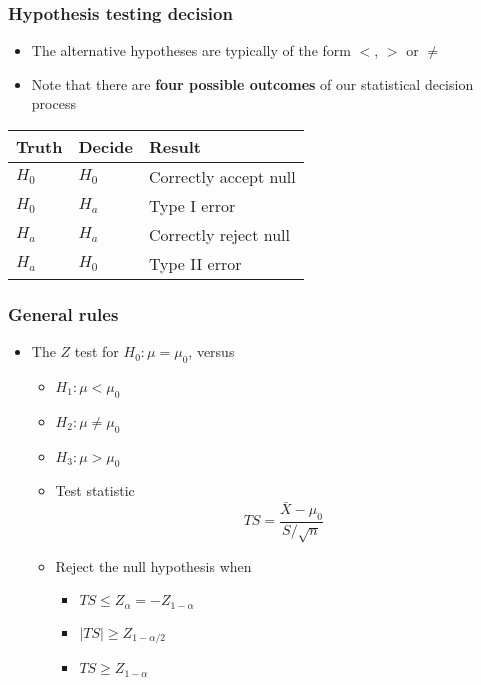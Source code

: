 \documentclass[10pt,article]{article}
\begin{document}
\subsubsection{Hypothesis testing decision}
\label{sec:org731ce84}
\begin{itemize}
\item The alternative hypotheses are typically of the form \(<\), \(>\) or \(\neq\)
\item Note that there are \textbf{four possible outcomes} of our {\color{green}statistical decision} process
\end{itemize}
\begin{center}
\begin{tabular}{lll}
Truth & Decide & Result\\
\hline
\(H_0\) & \(H_0\) & Correctly accept null\\
\(H_0\) & \(H_a\) & Type I error\\
\(H_a\) & \(H_a\) & Correctly reject null\\
\(H_a\) & \(H_0\) & Type II error\\
\end{tabular}
\end{center}
\subsubsection{General rules}
\label{sec:org1cd9738}
\begin{itemize}
\item The \(Z\) test for \(H_0:\mu = \mu_0\), versus
\begin{itemize}
\item \(H_1: \mu < \mu_0\)
\item \(H_2: \mu \neq \mu_0\)
\item \(H_3: \mu > \mu_0\)
\end{itemize}
\begin{itemize}
\item Test statistic $$TS = \frac{\bar{X} - \mu_0}{S / \sqrt{n}}$$
\item Reject the null hypothesis when
\begin{itemize}
\item \(TS \leq Z_{\alpha} = -Z_{1 - \alpha}\)
\item \(|TS| \geq Z_{1 - \alpha / 2}\)
\item \(TS \geq Z_{1 - \alpha}\)
\end{itemize}
\end{itemize}
\end{itemize}
\end{document}
